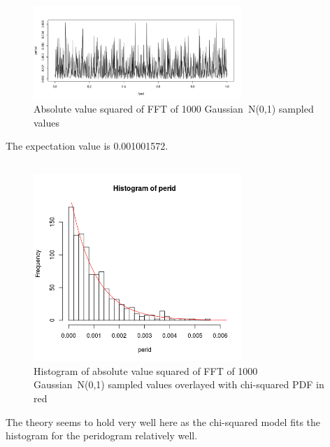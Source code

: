 \documentclass[paper=a4, fontsize=11pt]{scrartcl}
\numberwithin{equation}{section} %
\numberwithin{figure}{section} %
\numberwithin{table}{section} %
\begin{document}
\begin{figure}[htp]
	\centering
	\includegraphics[width=0.7\textwidth, clip]{q3a.png} 
	\caption{Absolute value squared of FFT of 1000 Gaussian~N(0,1) sampled values}
\end{figure}

The expectation value is 0.001001572.
\pagebreak
\subsection{}
\begin{figure}[htp]
	\centering
	\includegraphics[width=0.7\textwidth, clip]{q3b.png} 
	\caption{Histogram of absolute value squared of FFT of 1000 Gaussian~N(0,1) sampled values overlayed with chi-squared PDF in red}
\end{figure}

The theory seems to hold very well here as the chi-squared model fits the histogram for the peridogram relatively well.
\end{document}

